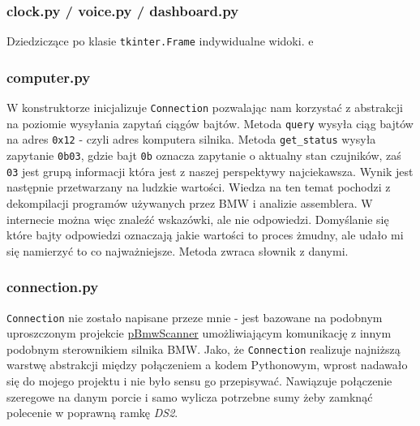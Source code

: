 \documentclass[declaration,shortabstract, inz]{iithesis}
\begin{document}
\subsubsection{clock.py / voice.py / dashboard.py}
    Dziedziczące po klasie \texttt{tkinter.Frame} indywidualne widoki. e


\subsubsection{computer.py}
% 
    W konstruktorze inicjalizuje \texttt{Connection} pozwalając nam korzystać z abstrakcji na poziomie wysyłania zapytań ciągów bajtów. Metoda \texttt{query} wysyła ciąg bajtów na adres \texttt{0x12} - czyli adres komputera silnika. Metoda \texttt{get_status} wysyła zapytanie \texttt{0b03}, gdzie bajt \texttt{0b} oznacza zapytanie o aktualny stan czujników, zaś \texttt{03} jest grupą informacji która jest z naszej perspektywy najciekawsza.
    Wynik jest następnie przetwarzany na ludzkie wartości. Wiedza na ten temat pochodzi z dekompilacji programów używanych przez BMW i analizie assemblera. W internecie można więc znaleźć wskazówki, ale nie odpowiedzi. Domyślanie się które bajty odpowiedzi oznaczają jakie wartości to proces żmudny, ale udało mi się namierzyć to co najważniejsze. Metoda zwraca słownik z danymi.

    
\subsubsection{connection.py}
% 
    \texttt{Connection} nie zostało napisane przeze mnie - jest bazowane na podobnym uproszczonym projekcie \href{https://github.com/gigijoe/pBmwScanner}{\color{blue} pBmwScanner} umożliwiającym komunikację z innym podobnym sterownikiem silnika BMW. Jako, że \texttt{Connection} realizuje najniższą warstwę abstrakcji między połączeniem a kodem Pythonowym, wprost nadawało się do mojego projektu i nie było sensu go przepisywać. Nawiązuje połączenie szeregowe na danym porcie i samo wylicza potrzebne sumy żeby zamknąć polecenie w poprawną ramkę \textit{DS2}.
\end{document}
